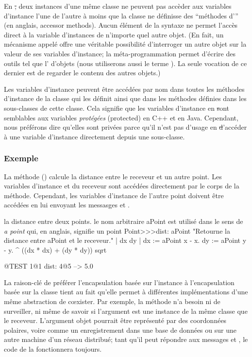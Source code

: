 \documentclass[a4paper,10pt,twoside]{book}
\begin{document}
En \st, deux instances d'une même classe ne peuvent pas accèder aux variables d'instance l'une de l'autre à moins que la classe ne définisse des ``méthodes d''' (en anglais, accessor methods).
Aucun élément de la syntaxe ne permet l'accès direct à la variable d'instances de n'importe quel autre objet.
(En fait, un mécanisme appelé 
offre une véritable possibilité d'interroger un autre objet sur la valeur de ses variables d'instance; la méta-programmation permet d'écrire des outils tel que l' d'objets (nous utiliserons aussi le terme ). La seule vocation de ce dernier est de regarder le contenu des autres objets.)

Les variables d'instance peuvent être accédées par 
nom dans toutes les méthodes d'instance de la classe qui les définit
ainsi que dans les méthodes définies dans les sous-classes de cette classe.
Cela signifie que les variables d'instance en \st sont semblables aux
variables \emph{protégées} (protected) en C++ et en Java. Cependant,
nous préférons dire qu'elles sont privées parce qu'il n'est pas d'usage en \st d'accéder à une variable d'instance directement depuis une sous-classe. 
\subsubsection{Exemple}
La méthode  () calcule la distance entre le receveur et un autre point. Les variables d'instance  et  du receveur sont accédées directement par le corps de la méthode. Cependant, les variables d'instance de l'autre point doivent être accédées en lui envoyant les messasges  et .

\begin{method}[dist:]{la distance entre deux points. le nom arbitraire aPoint est utilisé dans le sens de \emph{a point} qui, en anglais, signifie un point}
Point>>>dist: aPoint 
	"Retourne la distance entre aPoint et le receveur."
	| dx dy |
	dx := aPoint x - x.
	dy :=  aPoint y - y.
	^ ((dx * dx) + (dy * dy)) sqrt
\end{method}

\begin{code}{@TEST}
1@1 dist: 4@5 --> 5.0
\end{code}

La raison-clé de préférer l'encapsulation basée sur l'instance
à l'encapsulation basée sur la classe tient au fait qu'elle permet
à différentes implémentations d'une même abstraction de c\oe{}xister.
Par exemple, la méthode  n'a besoin ni de surveiller, ni 
même de savoir si l'argument  est une instance de la même classe
que le receveur.  L'argument objet pourrait être représenté par des
coordonnées polaires, voire comme un enregistrement dans une base de données ou sur une autre machine d'un réseau distribué; tant qu'il peut répondre
aux messages  et , le code de la  fonctionnera toujours.
\end{document}
